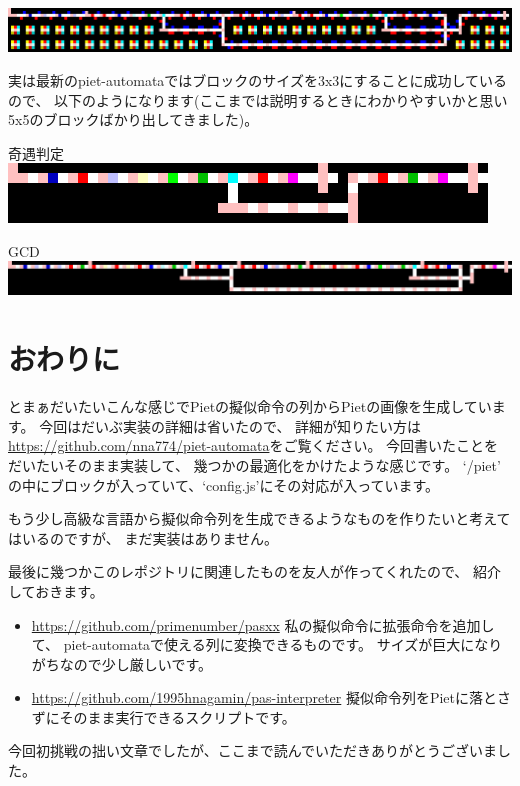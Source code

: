 \includegraphics[width=\textwidth]{images/6c82e735b7bd782e1f328f3d309c1286.png}

実は最新のpiet-automataではブロックのサイズを3x3にすることに成功しているので、
以下のようになります(ここまでは説明するときにわかりやすいかと思い5x5のブロックばかり出してきました)。

奇遇判定\\
\includegraphics[width=\textwidth]{images/e3bbb6f046fe9aa8d7c0ae5d01e34798.png}

GCD\\
\includegraphics[width=\textwidth]{images/4a63cd9654933cc75ca74e60f3982241.png}

\section{おわりに}

とまぁだいたいこんな感じでPietの擬似命令の列からPietの画像を生成しています。
今回はだいぶ実装の詳細は省いたので、
詳細が知りたい方は\url{https://github.com/nna774/piet-automata}をご覧ください。
今回書いたことをだいたいそのまま実装して、
幾つかの最適化をかけたような感じです。
`/piet' の中にブロックが入っていて、`config.js'にその対応が入っています。

もう少し高級な言語から擬似命令列を生成できるようなものを作りたいと考えてはいるのですが、
まだ実装はありません。

最後に幾つかこのレポジトリに関連したものを友人が作ってくれたので、
紹介しておきます。

\begin{itemize}
\item
  \url{https://github.com/primenumber/pasxx} 私の擬似命令に拡張命令を追加して、
  piet-automataで使える列に変換できるものです。
  サイズが巨大になりがちなので少し厳しいです。
\item
  \url{https://github.com/1995hnagamin/pas-interpreter} 擬似命令列をPietに落とさずにそのまま実行できるスクリプトです。
\end{itemize}

今回初挑戦の拙い文章でしたが、ここまで読んでいただきありがとうございました。
